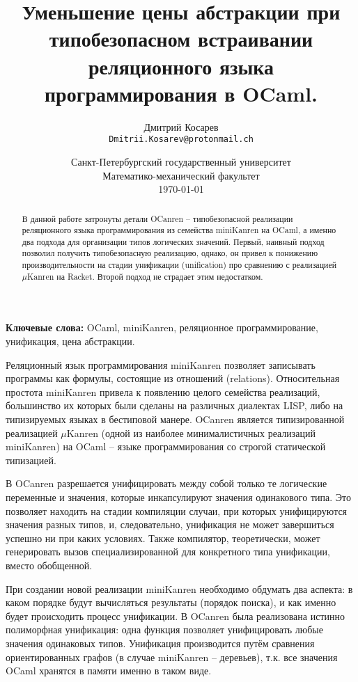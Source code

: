 \documentclass[10pt]{article}
\title{Уменьшение цены абстракции при типобезопасном встраивании реляционного языка программирования в OCaml.}
\author{
        Дмитрий Косарев\\ \texttt{Dmitrii.Kosarev@protonmail.ch}
}
\date{
  Санкт-Петербургский государственный университет\\
  Математико-механический факультет\\
  \today
}
\begin{document}
\maketitle

\begin{abstract}
В данной работе затронуты детали OCanren -- типобезопасной реализации реляционного языка программирования
из семейства miniKanren на OCaml, а именно два подхода для организации типов логических значений. Первый,
наивный подход позволил получить типобезопасную реализацию, однако, он привел к понижению производительности
на стадии унификации (unification) про сравнению с реализацией $\mu$Kanren на Racket. Второй подход не 
страдает этим недостатком.

\end{abstract}

\textbf{Ключевые слова:} OCaml, miniKanren, реляционное программирование, унификация, цена абстракции.

\vspace{5mm}

Реляционный язык программирования miniKanren
позволяет записывать программы как формулы, состоящие из отношений
(relations). Относительная простота miniKanren привела к появлению целого семейства реализаций, большинство их 
которых были сделаны на различных диалектах LISP, либо на типизируемых языках в бестиповой манере. OCanren\cite{OCanren} 
является типизированной реализацией $\mu$Kanren\cite{uKanren} (одной из наиболее минималистичных реализаций miniKanren) 
на OCaml -- языке программирования со строгой статической типизацией.

В OCanren разрешается унифицировать между собой только те логические переменные и значения, которые инкапсулируют
значения одинакового типа. Это позволяет находить на стадии компиляции случаи, при которых унифицируются 
значения разных типов, и, следовательно, унификация не может завершиться успешно ни при каких условиях. Также
компилятор, теоретически, может генерировать вызов специализированной для конкретного типа унификации, вместо 
обобщенной.

При создании новой реализации miniKanren необходимо обдумать два аспекта: в каком порядке будут вычисляться 
результаты (порядок поиска), и как именно будет происходить процесс унификации. В OCanren была реализована истинно 
полиморфная унификация: одна функция позволяет унифицировать любые значения одинаковых типов. Унификация производится
путём сравнения ориентированных графов (в случае miniKanren -- деревьев), т.к. все значения OCaml хранятся в 
памяти именно в таком виде.
\end{document}
